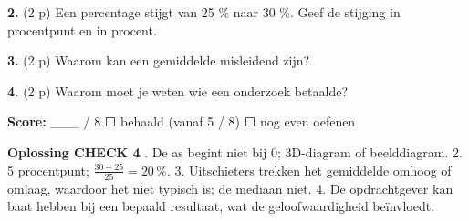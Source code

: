 \textbf{2.} (2 p) Een percentage stijgt van 25 \% naar 30 \%. Geef de stijging in procentpunt en in procent. \lijn

\textbf{3.} (2 p) Waarom kan een gemiddelde misleidend zijn? \lijn

\textbf{4.} (2 p) Waarom moet je weten wie een onderzoek betaalde? \lijn

\begin{doel}
\textbf{Score:} \_\_\_ / 8 \quad ☐ behaald (vanaf 5 / 8) \quad ☐ nog even oefenen
\end{doel}

\begin{oplossing}
\textbf{Oplossing CHECK 4} . De as begint niet bij 0; 3D-diagram of beelddiagram. 2. 5 procentpunt; $\frac{30-25}{25}=20\,\%$. 3. Uitschieters trekken het gemiddelde omhoog of omlaag, waardoor het niet typisch is; de mediaan niet. 4. De opdrachtgever kan baat hebben bij een bepaald resultaat, wat de geloofwaardigheid beïnvloedt.
\end{oplossing}
